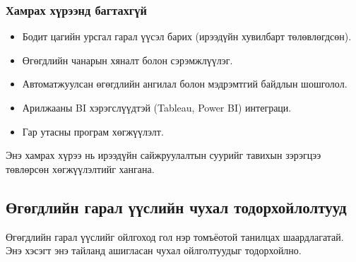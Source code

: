 \subsubsection{Хамрах хүрээнд багтахгүй}

\begin{itemize}
    \item Бодит цагийн урсгал гарал үүсэл барих (ирээдүйн хувилбарт төлөвлөгдсөн).
    \item Өгөгдлийн чанарын хяналт болон сэрэмжлүүлэг.
    \item Автоматжуулсан өгөгдлийн ангилал болон мэдрэмтгий байдлын шошголол.
    \item Арилжааны BI хэрэгслүүдтэй (Tableau, Power BI) интеграци.
    \item Гар утасны програм хөгжүүлэлт.
\end{itemize}

Энэ хамрах хүрээ нь ирээдүйн сайжруулалтын суурийг тавихын зэрэгцээ төвлөрсөн хөгжүүлэлтийг хангана.

\subsection{Өгөгдлийн гарал үүслийн чухал тодорхойлолтууд}
\label{subsec:dl_definitions}

Өгөгдлийн гарал үүслийг ойлгоход гол нэр томъёотой танилцах шаардлагатай. Энэ хэсэгт энэ тайланд ашигласан чухал ойлголтуудыг тодорхойлно.

